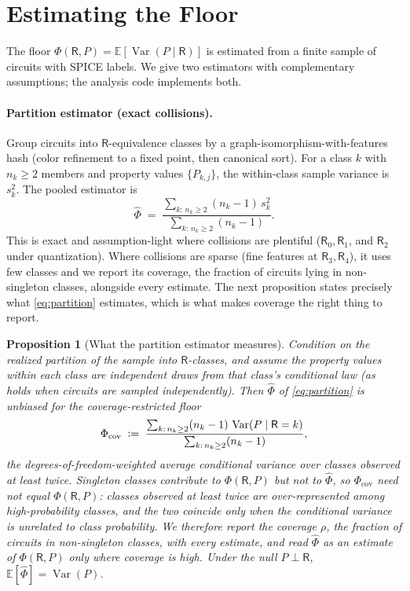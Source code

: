 \documentclass[10pt]{article}
\newtheorem{proposition}{Proposition}
\newcommand{\E}{\mathbb{E}}
\newcommand{\Var}{\operatorname{Var}}
\newcommand{\R}{\mathsf{R}}
\newcommand{\eqdef}{\vcentcolon=}
\begin{document}
\section{Estimating the Floor}
\label{sec:estimators}

The floor $\Phi(\R,P)=\E[\Var(P\mid\R)]$ is estimated from a finite sample of circuits with SPICE labels. We give two estimators with complementary assumptions; the analysis code implements both.

\paragraph{Partition estimator (exact collisions).}
Group circuits into $\R$-equivalence classes by a graph-isomorphism-with-features hash (color refinement to a fixed point, then canonical sort). For a class $k$ with $n_k\ge 2$ members and property values $\{P_{k,j}\}$, the within-class sample variance is $s_k^2$. The pooled estimator is
\begin{equation}
\widehat{\Phi} \;=\; \frac{\sum_{k:\,n_k\ge 2}(n_k-1)\,s_k^2}{\sum_{k:\,n_k\ge 2}(n_k-1)} .
\label{eq:partition}
\end{equation}
This is exact and assumption-light where collisions are plentiful ($\R_0,\R_1$, and $\R_2$ under quantization). Where collisions are sparse (fine features at $\R_3,\R_4$), it uses few classes and we report its coverage, the fraction of circuits lying in non-singleton classes, alongside every estimate. The next proposition states precisely what \cref{eq:partition} estimates, which is what makes coverage the right thing to report.

\begin{proposition}[What the partition estimator measures]
\label{prop:estimator}
Condition on the realized partition of the sample into $\R$-classes, and assume the property values within each class are independent draws from that class's conditional law (as holds when circuits are sampled independently). Then $\widehat{\Phi}$ of \cref{eq:partition} is unbiased for the coverage-restricted floor
\begin{equation}
\Phi_{\mathrm{cov}} \;\eqdef\; \frac{\sum_{k:\,n_k\ge 2}(n_k-1)\,\Var(P\mid \R=k)}{\sum_{k:\,n_k\ge 2}(n_k-1)},
\label{eq:phicov}
\end{equation}
the degrees-of-freedom-weighted average conditional variance over classes observed at least twice. Singleton classes contribute to $\Phi(\R,P)$ but not to $\widehat{\Phi}$, so $\Phi_{\mathrm{cov}}$ need not equal $\Phi(\R,P)$: classes observed at least twice are over-represented among high-probability classes, and the two coincide only when the conditional variance is unrelated to class probability. We therefore report the coverage $\rho$, the fraction of circuits in non-singleton classes, with every estimate, and read $\widehat{\Phi}$ as an estimate of $\Phi(\R,P)$ only where coverage is high. Under the null $P\perp\R$, $\E[\widehat{\Phi}]=\Var(P)$.
\end{proposition}
\end{document}
